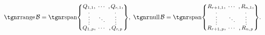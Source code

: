 $\range\mB=\Spn{\small\begin{Bmatrix} \underset{\;,}{Q_{1,1}}, &\hspace{-6pt} \cdots &\hspace{-6pt} ,\underset{\!\!,}{Q_{r\:\!\!,\;\!1}},\\[-2pt] \vdots &\hspace{-6pt} \ddots &\hspace{-6pt} \vdots\\[-2pt] \overset{\;,}{Q_{1,\;\!p}}, &\hspace{-6pt} \cdots &\hspace{-6pt} ,\overset{\!\!\!,}{Q_{r\:\!\!,\;\!p}}\end{Bmatrix}},\;\null\mB=\Spn{\small\begin{Bmatrix} \underset{\;,}{R_{r+1,1}}, &\hspace{-6pt} \cdots &\hspace{-6pt} ,\underset{\!\!,}{R_{n,1}},\\[-2pt] \vdots &\hspace{-6pt} \ddots &\hspace{-6pt} \vdots\\[-2pt] \overset{\;,}{R_{r+1,\;\!p}}, &\hspace{-6pt} \cdots &\hspace{-6pt} ,\overset{\!\!\!,}{R_{n,\;\!p}}\end{Bmatrix}}.$\PfEnd[-14pt]
\SepLine\pagebreak


